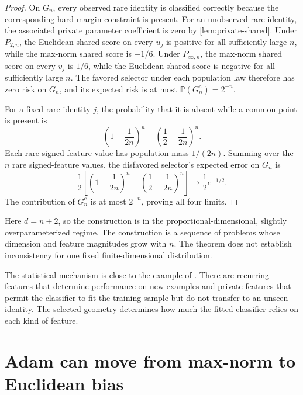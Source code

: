 \documentclass[11pt,twoside]{article}
\renewcommand{\P}{\mathbb P}
\theoremstyle{definition}
\theoremstyle{remark}
\begin{document}
\begin{proof}
On $G_n$, every observed rare identity is classified correctly because the
corresponding hard-margin constraint is present. For an unobserved rare
identity, the associated private parameter coefficient is zero by
\cref{lem:private-shared}. Under $P_{2,n}$, the Euclidean
shared score on every $u_j$ is positive for all sufficiently large $n$, while
the max-norm shared score is $-1/6$. Under $P_{\infty,n}$, the max-norm
shared score on every $v_j$ is $1/6$, while the Euclidean shared score is
negative for all sufficiently large $n$. The favored selector under each
population law therefore has
zero risk on $G_n$, and its expected risk is at most $\P(G_n^c)=2^{-n}$.

For a fixed rare identity $j$, the probability that it is absent while a
common point is present is
\[
 \left(1-\frac1{2n}\right)^n
 -\left(\frac12-\frac1{2n}\right)^n.
\]
Each rare signed-feature value has population mass $1/(2n)$. Summing over the
$n$ rare signed-feature values, the disfavored selector's expected error on
$G_n$ is
\begin{equation}
 \frac12\left[
 \left(1-\frac1{2n}\right)^n
 -\left(\frac12-\frac1{2n}\right)^n
 \right]\longrightarrow\frac12e^{-1/2}.
 \label{eq:private-unseen-mass}
\end{equation}
The contribution of $G_n^c$ is at most $2^{-n}$, proving all four limits.
\end{proof}

Here $d=n+2$, so the construction is in the proportional-dimensional,
slightly overparameterized regime. The construction is a sequence of problems
whose dimension and feature magnitudes grow with $n$. The theorem does not
establish inconsistency for one fixed finite-dimensional distribution.

The statistical mechanism is close to the example of \citet{wilson2017}.
There are recurring features that determine performance on new examples and
private features that permit the classifier to fit the training sample but do
not transfer to an unseen identity. The selected geometry determines how much
the fitted classifier relies on each kind of feature.

\section{Adam can move from max-norm to Euclidean bias}
\label{sec:adam}
\end{document}
